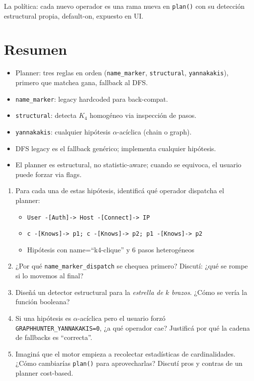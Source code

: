 \noindent
La política: cada nuevo operador es una rama nueva en
\texttt{plan()} con su detección estructural propia, default-on,
expuesto en UI.

\section{Resumen}

\begin{itemize}
    \item Planner: tres reglas en orden
    (\texttt{name\_marker}, \texttt{structural}, \texttt{yannakakis}),
    primero que matchea gana, fallback al DFS.
    \item \texttt{name\_marker}: legacy hardcoded
    para back-compat.
    \item \texttt{structural}: detecta \(K_4\) homogéneo via
    inspección de pasos.
    \item \texttt{yannakakis}: cualquier hipótesis
    \(\alpha\)-acíclica (chain o graph).
    \item DFS legacy es el fallback genérico; implementa cualquier
    hipótesis.
    \item El planner es estructural, no statistic-aware; cuando se
    equivoca, el usuario puede forzar via flags.
\end{itemize}

\begin{ejercicios}
\begin{enumerate}
    \item \starred{} Para cada una de estas hipótesis, identificá
    qué operador dispatcha el planner:
    \begin{itemize}
        \item \texttt{User -[Auth]-> Host -[Connect]-> IP}
        \item \texttt{c -[Knows]-> p1; c -[Knows]-> p2; p1 -[Knows]-> p2}
        \item Hipótesis con name=``k4-clique'' y 6 pasos heterogéneos
    \end{itemize}

    \item ¿Por qué \texttt{name\_marker\_dispatch} se chequea
    primero? Discutí: ¿qué se rompe si lo movemos al final?

    \item \starred{} Diseñá un detector estructural para la
    \emph{estrella de \(k\) brazos}. ¿Cómo se vería la función
    booleana?

    \item Si una hipótesis es \(\alpha\)-acíclica pero el usuario
    forzó \texttt{GRAPHHUNTER\_YANNAKAKIS=0}, ¿a qué operador cae?
    Justificá por qué la cadena de fallbacks es ``correcta''.

    \item Imaginá que el motor empieza a recolectar estadísticas
    de cardinalidades. ¿Cómo cambiarías \texttt{plan()} para
    aprovecharlas? Discutí pros y contras de un planner
    cost-based.
\end{enumerate}
\end{ejercicios}
